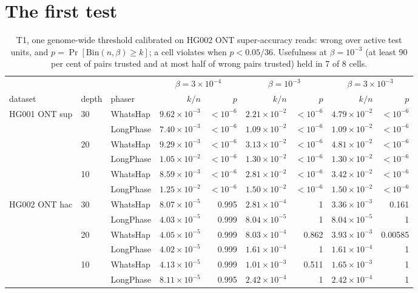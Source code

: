 \documentclass[11pt]{article}
\newcommand{\Bin}{\mathrm{Bin}}
\theoremstyle{definition}
\theoremstyle{remark}
\begin{document}
\section{The first test}\label{app:t1}

\begin{table}[h]
\centering\footnotesize\setlength{\tabcolsep}{4pt}
\begin{tabular}{@{}lll*{3}{rr}@{}}
\toprule
 & & & \multicolumn{2}{c}{$\beta=3\times10^{-4}$} & \multicolumn{2}{c}{$\beta=10^{-3}$} & \multicolumn{2}{c}{$\beta=3\times10^{-3}$}\\
\cmidrule(lr){4-5}\cmidrule(lr){6-7}\cmidrule(lr){8-9}
dataset & depth & phaser & $k/n$ & $p$ & $k/n$ & $p$ & $k/n$ & $p$\\
\midrule
HG001 ONT sup & 30 & WhatsHap & $9.62\times10^{-3}$ & $<10^{-6}$ & $2.21\times10^{-2}$ & $<10^{-6}$ & $4.79\times10^{-2}$ & $<10^{-6}$\\
 &  & LongPhase & $7.40\times10^{-3}$ & $<10^{-6}$ & $1.09\times10^{-2}$ & $<10^{-6}$ & $1.09\times10^{-2}$ & $<10^{-6}$\\
 & 20 & WhatsHap & $9.29\times10^{-3}$ & $<10^{-6}$ & $3.13\times10^{-2}$ & $<10^{-6}$ & $4.81\times10^{-2}$ & $<10^{-6}$\\
 &  & LongPhase & $1.05\times10^{-2}$ & $<10^{-6}$ & $1.30\times10^{-2}$ & $<10^{-6}$ & $1.30\times10^{-2}$ & $<10^{-6}$\\
 & 10 & WhatsHap & $8.59\times10^{-3}$ & $<10^{-6}$ & $2.81\times10^{-2}$ & $<10^{-6}$ & $3.42\times10^{-2}$ & $<10^{-6}$\\
 &  & LongPhase & $1.25\times10^{-2}$ & $<10^{-6}$ & $1.50\times10^{-2}$ & $<10^{-6}$ & $1.50\times10^{-2}$ & $<10^{-6}$\\
HG002 ONT hac & 30 & WhatsHap & $8.07\times10^{-5}$ & 0.995 & $2.81\times10^{-4}$ & 1 & $3.36\times10^{-3}$ & 0.161\\
 &  & LongPhase & $4.03\times10^{-5}$ & 0.999 & $8.04\times10^{-5}$ & 1 & $8.04\times10^{-5}$ & 1\\
 & 20 & WhatsHap & $4.05\times10^{-5}$ & 0.999 & $8.03\times10^{-4}$ & 0.862 & $3.93\times10^{-3}$ & 0.00585\\
 &  & LongPhase & $4.02\times10^{-5}$ & 0.999 & $1.61\times10^{-4}$ & 1 & $1.61\times10^{-4}$ & 1\\
 & 10 & WhatsHap & $4.13\times10^{-5}$ & 0.999 & $1.01\times10^{-3}$ & 0.511 & $1.65\times10^{-3}$ & 1\\
 &  & LongPhase & $8.11\times10^{-5}$ & 0.995 & $2.42\times10^{-4}$ & 1 & $2.42\times10^{-4}$ & 1\\
\bottomrule
\end{tabular}
\caption{T1, one genome-wide threshold calibrated on HG002 ONT
super-accuracy reads: wrong over active test units, and
$p=\Pr[\Bin(n,\beta)\ge k]$; a cell violates when $p<0.05/36$. Usefulness at
$\beta=10^{-3}$ (at least 90 per cent of pairs trusted and at most half of
wrong pairs trusted) held in 7 of 8 cells.}
\label{tab:t1}
\end{table}
\end{document}
